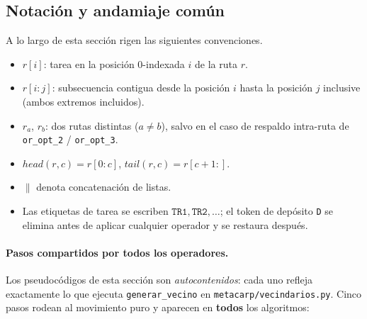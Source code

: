 \subsection{Notación y andamiaje común}
\label{subsec:notation-ops}

A lo largo de esta sección rigen las siguientes convenciones.

\begin{itemize}
    \item $r[i]$: tarea en la posición 0-indexada $i$ de la ruta $r$.
    \item $r[i{:}j]$: subsecuencia contigua desde la posición $i$ hasta la
          posición $j$ inclusive (ambos extremos incluidos).
    \item $r_a$, $r_b$: dos rutas distintas ($a \neq b$), salvo en el caso
          de respaldo intra-ruta de \texttt{or\_opt\_2} / \texttt{or\_opt\_3}.
    \item $\mathit{head}(r, c) = r[0{:}c]$,\enspace
          $\mathit{tail}(r, c) = r[c{+}1{:}]$.
    \item $\|$ denota concatenación de listas.
    \item Las etiquetas de tarea se escriben $\mathtt{TR1}, \mathtt{TR2},
          \ldots$; el token de depósito \texttt{D} se elimina antes de
          aplicar cualquier operador y se restaura después.
\end{itemize}

\paragraph{Pasos compartidos por todos los operadores.}
Los pseudocódigos de esta sección son \emph{autocontenidos}: cada uno refleja
exactamente lo que ejecuta \texttt{generar\_vecino} en
\texttt{metacarp/vecindarios.py}.  Cinco pasos rodean al movimiento puro y
aparecen en \textbf{todos} los algoritmos:

